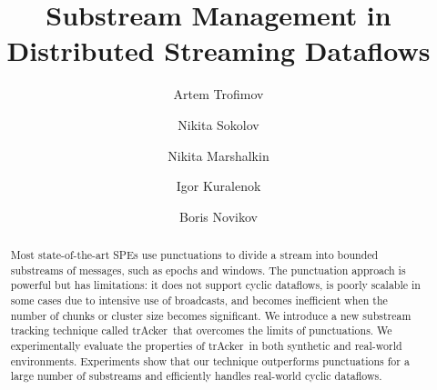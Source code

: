 \documentclass[sigconf]{acmart}
\newcommand {\tracker} {trAcker}
\begin{document}
\title {Substream Management in Distributed Streaming Dataflows}

\author{Artem Trofimov}

\author{Nikita Sokolov}

\author{Nikita Marshalkin}

\author{Igor Kuralenok}

\author{Boris Novikov}


\begin{abstract}
Most state-of-the-art SPEs use punctuations to divide a stream into bounded substreams of messages, such as epochs and windows. The punctuation approach is powerful but has limitations: it does not support cyclic dataflows, is poorly scalable in some cases due to intensive use of broadcasts, and becomes inefficient when the number of chunks or cluster size becomes significant. We introduce a new substream tracking technique called \tracker\ that overcomes the limits of punctuations. We experimentally evaluate the properties of \tracker\ in both synthetic and real-world environments. Experiments show that our technique outperforms punctuations for a large number of substreams and efficiently handles real-world cyclic dataflows.
\end{abstract}
\end{document}
